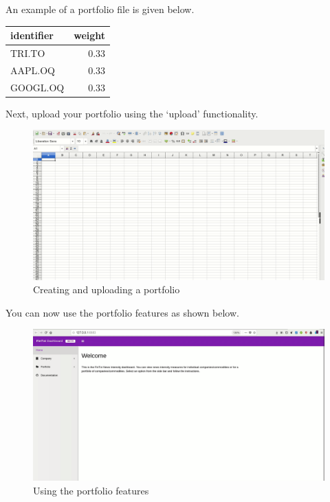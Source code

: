 \documentclass[]{book}
\theoremstyle{definition}
\theoremstyle{definition}
\theoremstyle{definition}
\theoremstyle{remark}
\begin{document}
An example of a portfolio file is given below.

\begin{table}[H]
\centering
\begin{tabular}{l|r}
\hline
identifier & weight\\
\hline
TRI.TO & 0.33\\
\hline
AAPL.OQ & 0.33\\
\hline
GOOGL.OQ & 0.33\\
\hline
\end{tabular}
\end{table}

Next, upload your portfolio using the `upload' functionality.

\begin{figure}
\centering
\includegraphics{img/createportfolio.gif}
\caption{Creating and uploading a portfolio}
\end{figure}

You can now use the portfolio features as shown below.

\begin{figure}
\centering
\includegraphics{img/portfolio_overview.gif}
\caption{Using the portfolio features}
\end{figure}
\end{document}
